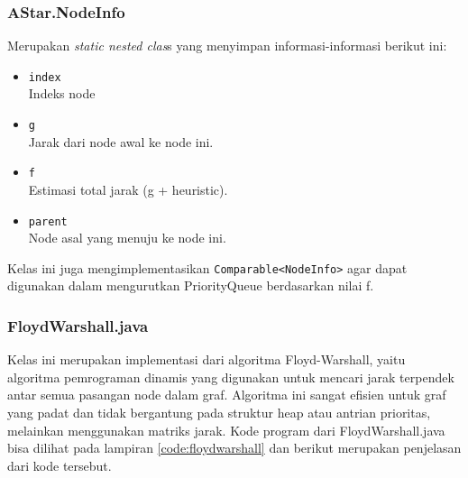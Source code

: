 \subsubsection{AStar.NodeInfo}
Merupakan \textit{static nested clas}s yang menyimpan informasi-informasi berikut ini:
\begin{itemize}
    \item \texttt{index}
    \\ Indeks node
    \item \texttt{g}
    \\ Jarak dari node awal ke node ini.
    \item \texttt{f}
    \\ Estimasi total jarak (g + heuristic).
    \item \texttt{parent}
    \\ Node asal yang menuju ke node ini.
\end{itemize}
\noindent
Kelas ini juga mengimplementasikan \texttt{Comparable<NodeInfo>} agar dapat digunakan dalam mengurutkan PriorityQueue berdasarkan nilai f.

\subsubsection{FloydWarshall.java}
Kelas ini merupakan implementasi dari algoritma Floyd-Warshall, yaitu algoritma pemrograman dinamis yang digunakan untuk mencari jarak terpendek antar semua pasangan node dalam graf. Algoritma ini sangat efisien untuk graf yang padat dan tidak bergantung pada struktur heap atau antrian prioritas, melainkan menggunakan matriks jarak. Kode program dari FloydWarshall.java bisa dilihat pada lampiran \ref{code:floydwarshall} dan berikut merupakan penjelasan dari kode tersebut.

